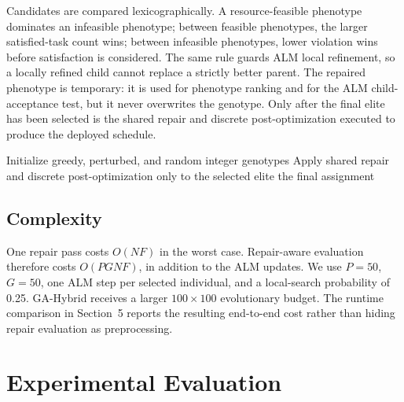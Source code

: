 \documentclass[pdflatex,sn-mathphys-num]{sn-jnl}
\begin{document}
Candidates are compared lexicographically. A resource-feasible phenotype dominates an infeasible phenotype; between feasible phenotypes, the larger satisfied-task count wins; between infeasible phenotypes, lower violation wins before satisfaction is considered. The same rule guards ALM local refinement, so a locally refined child cannot replace a strictly better parent. The repaired phenotype is temporary: it is used for phenotype ranking and for the ALM child-acceptance test, but it never overwrites the genotype. Only after the final elite has been selected is the shared repair and discrete post-optimization executed to produce the deployed schedule.

\begin{algorithm}[t]
\caption{Outcome-Aligned M-CA-ALM}
\label{alg:mca_official}
\SetAlgoLined
{}
Initialize greedy, perturbed, and random integer genotypes\;
Apply shared repair and discrete post-optimization only to the selected elite\;
\Return the final assignment\;
\end{algorithm}

\subsection{Complexity}
One repair pass costs $O(NF)$ in the worst case. Repair-aware evaluation therefore costs $O(PGNF)$, in addition to the ALM updates. We use $P=50$, $G=50$, one ALM step per selected individual, and a local-search probability of 0.25. GA-Hybrid receives a larger $100\times100$ evolutionary budget. The runtime comparison in Section~5 reports the resulting end-to-end cost rather than hiding repair evaluation as preprocessing.



\section{Experimental Evaluation}
\end{document}
